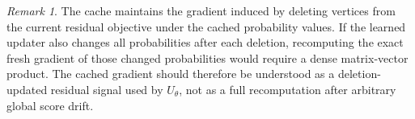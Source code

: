 \documentclass[11pt]{article}
\theoremstyle{plain}
\theoremstyle{remark}
\newtheorem{remark}[theorem]{Remark}
\begin{document}
\begin{remark}
  The cache maintains the gradient induced by deleting vertices from the current
  residual objective under the cached probability values. If the learned updater
  also changes all probabilities after each deletion, recomputing the exact fresh
  gradient of those changed probabilities would require a dense matrix-vector
  product. The cached gradient should therefore be understood as a
  deletion-updated residual signal used by $U_\theta$, not as a full recomputation
  after arbitrary global score drift.
\end{remark}
\end{document}
